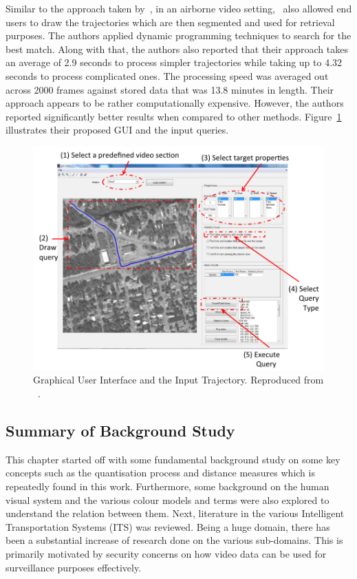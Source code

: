 Similar to the approach taken by~\cite{lai2015video}, in an airborne video
setting,~ also allowed end users to draw the
trajectories which are then segmented and used for retrieval purposes. The
authors applied dynamic programming techniques to search for the best match.
Along with that, the authors also reported that their approach takes an average
of 2.9 seconds to process simpler trajectories while taking up to 4.32 seconds to process complicated ones. The processing speed was averaged out across 2000
frames against stored data that was 13.8 minutes in length. Their approach appears to be rather computationally expensive. However, the authors reported significantly
better results when compared to other methods. Figure~\ref{fig:drawquery2}
illustrates their proposed GUI and the input queries.
\begin{figure}[hbt!]
  \centering
  \includegraphics[width=.6\textwidth]{image/lit/trajdraw2.PNG}
  \caption[Graphical User Interface and the Input Trajectory] {Graphical User
  Interface and the Input Trajectory. Reproduced from
 ~.}
\label{fig:drawquery2}
\end{figure}


\vspace{1em}
\subsection{Summary of Background Study}

This chapter started off with some  fundamental background study on some key concepts such as the quantisation process and distance measures which is repeatedly found in this work. Furthermore, some background on the human visual system and the various colour models and terms were also explored to understand the relation between them. 
Next, literature in the various Intelligent Transportation Systems (ITS) was reviewed. Being a huge domain, there has been a substantial increase of research done on the various sub-domains. This is 
primarily motivated by security concerns on how video data can be used for surveillance purposes effectively.

